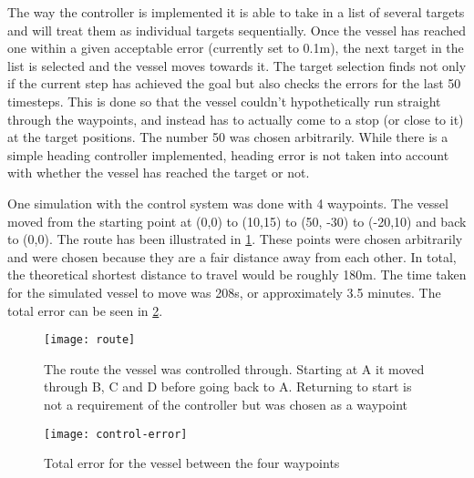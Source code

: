 The way the controller is implemented it is able to take in a list of several targets and will treat them as individual targets sequentially. Once the vessel has reached one within a given acceptable error (currently set to 0.1m), the next target in the list is selected and the vessel moves towards it. The target selection finds not only if the current step has achieved the goal but also checks the errors for the last 50 timesteps. This is done so that the vessel couldn't hypothetically run straight through the waypoints, and instead has to actually come to a stop (or close to it) at the target positions. The number 50 was chosen arbitrarily. While there is a simple heading controller implemented, heading error is not taken into account with whether the vessel has reached the target or not. 

One simulation with the control system was done with 4 waypoints. The vessel moved from the starting point at (0,0) to (10,15) to (50, -30) to (-20,10) and back to (0,0). The route has been illustrated in \cref{fig:route}. These points were chosen arbitrarily and were chosen because they are a fair distance away from each other. In total, the theoretical shortest distance to travel would be roughly 180m. The time taken for the simulated vessel to move was 208s, or approximately 3.5 minutes. The total error can be seen in \cref{fig:error}. 

\begin{figure}
	\centering
	\texttt{[image: route]}
	\caption{The route the vessel was controlled through. Starting at A it moved through B, C and D before going back to A. Returning to start is not a requirement of the controller but was chosen as a waypoint}
	\label{fig:route}
\end{figure}

\begin{figure}
	\centering
	\texttt{[image: control-error]}
	\caption{Total error for the vessel between the four waypoints}
	\label{fig:error}
\end{figure}
